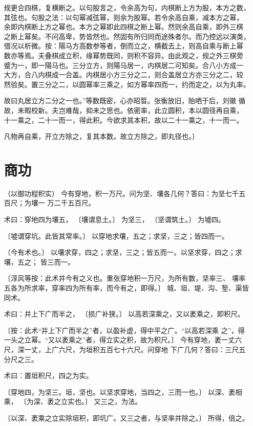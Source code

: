 \documentclass[a4paper,12pt,UTF8,twoside]{ctexbook}
\begin{document}
规更合四棋，复横断之。以句股言之，令余高为句，内棋断上方为股，本方之数， 其弦也。句股之法：以句幂减弦幂，则余为股幂。若令余高自乘，减本方之幂， 余即内棋断上方之幂也。本方之幂即此四棋之断上幂。然则余高自乘，即外三棋 之断上幂矣。不问高卑，势皆然也。然固有所归同而途殊者尔。而乃控远以演类， 借况以析微。按：陽马方高数参等者，倒而立之，横截去上，则高自乘与断上幂 数亦等焉。夫叠棋成立积，缘幂势既同，则积不容异。由此观之，规之外三棋旁 蹙为一，即一陽马也。三分立方，则陽马居一，内棋居二可知矣。合八小方成一 大方，合八内棋成一合盖。内棋居小方三分之二，则合盖居立方亦三分之二，较 然验矣。置三分之二，以圆幂率三乘之，如方幂率四而一，约而定之，以为丸率。

故曰丸居立方二分之一也。”等数既密，心亦昭晢。张衡放旧，贻哂于后，刘徽 循故，未暇校新。夫岂难哉，抑未之思也。依密率，此立圆积，本以圆径再自乘， 十一乘之，二十一而一，得此积。今欲求其本积，故以二十一乘之，十一而一。

凡物再自乘，开立方除之，复其本数。故立方除之，即丸径也。〕

\chapter{商功}
（以御功程积实） 今有穿地，积一万尺。问为坚、壤各几何？答曰：为坚七千五百尺；为壤一 万二千五百尺。

术曰：穿地四为壤五， 〔壤谓息土。〕 为坚三， 〔坚谓筑土。〕 为墟四。

〔墟谓穿坑。此皆其常率。〕 以穿地求壤，五之；求坚，三之；皆四而一。

〔今有术也。〕 以壤求穿，四之；求坚，三之；皆五而一。以坚求穿，四之；求壤，五之； 皆三而一。

〔淳风等按：此术并今有之义也。重张穿地积一万尺，为所有数，坚率三、 壤率五各为所求率，穿率四为所有率，而今有之，即得。〕 城、垣、堤、沟、堑、渠皆同术。

术曰：并上下广而半之， 〔损广补狭。〕 以高若深乘之，又以袤乘之，即积尺。

〔按：此术“并上下广而半之”者，以盈补虚，得中平之广。“以高若深乘 之”，得一头之立幂。“又以袤乘之”者，得立实之积，故为积尺。〕 今有穿地，袤一丈六尺，深一丈，上广六尺，为垣积五百七十六尺。问穿地 下广几何？答曰：三尺五分尺之三。

术曰：置垣积尺，四之为实。

〔穿地四，为坚三。垣，坚也。以坚求穿地，当四之，三而一也。〕 以深、袤相乘， 〔为深、袤之立实也。〕 又三之，为法。

〔以深、袤乘之立实除垣积，即坑广。又三之者，与坚率并除之。〕 所得，倍之。
\end{document}
